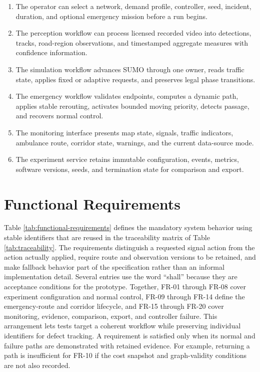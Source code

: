 \begin{enumerate}
\item The operator can select a network, demand profile, controller, seed, incident, duration, and optional emergency mission before a run begins.
\item The perception workflow can process licensed recorded video into detections, tracks, road-region observations, and timestamped aggregate measures with confidence information.
\item The simulation workflow advances SUMO through one owner, reads traffic state, applies fixed or adaptive requests, and preserves legal phase transitions.
\item The emergency workflow validates endpoints, computes a dynamic path, applies stable rerouting, activates bounded moving priority, detects passage, and recovers normal control.
\item The monitoring interface presents map state, signals, traffic indicators, ambulance route, corridor state, warnings, and the current data-source mode.
\item The experiment service retains immutable configuration, events, metrics, software versions, seeds, and termination state for comparison and export.
\end{enumerate}

\section{Functional Requirements}

Table \ref{tab:functional-requirements} defines the mandatory system behavior using stable identifiers that are reused in the traceability matrix of Table \ref{tab:traceability}. The requirements distinguish a requested signal action from the action actually applied, require route and observation versions to be retained, and make fallback behavior part of the specification rather than an informal implementation detail. Several entries use the word ``shall'' because they are acceptance conditions for the prototype. Together, FR-01 through FR-08 cover experiment configuration and normal control, FR-09 through FR-14 define the emergency-route and corridor lifecycle, and FR-15 through FR-20 cover monitoring, evidence, comparison, export, and controller failure. This arrangement lets tests target a coherent workflow while preserving individual identifiers for defect tracking. A requirement is satisfied only when its normal and failure paths are demonstrated with retained evidence. For example, returning a path is insufficient for FR-10 if the cost snapshot and graph-validity conditions are not also recorded.

